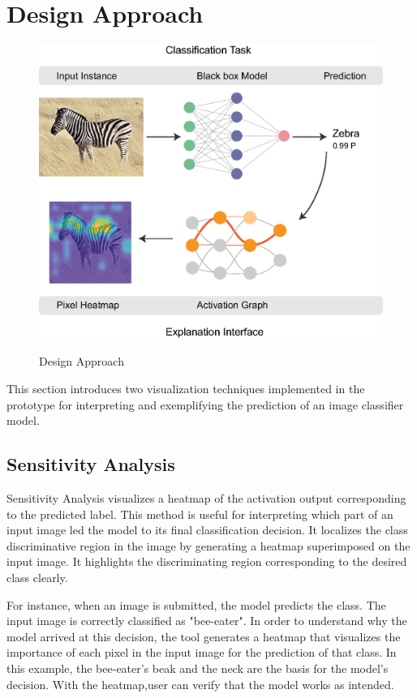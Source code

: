 \section{Design Approach}

\begin{figure}[htbp]
\centering\textbf{}
\includegraphics[width=1\textwidth]{images/method-schema-copy.eps}
\caption{Design Approach}
\label{fig:design-approach}
\end{figure}

This section introduces two visualization techniques implemented in the prototype for interpreting and exemplifying the prediction of an image classifier model.

\subsection{Sensitivity Analysis}

Sensitivity Analysis visualizes a heatmap of the activation output corresponding to the predicted label. This method is useful for interpreting which part of an input image led the model to its final classification decision. It localizes the class discriminative region in the image by generating a heatmap superimposed on the input image. It highlights the discriminating region corresponding to the desired class clearly.

For instance, when an image is submitted, the model predicts the class. The input image is correctly classified as "bee-eater". In order to understand why the model arrived at this decision, the tool generates a heatmap that visualizes the importance of each pixel in the input image for the prediction of that class. In this example, the bee-eater's beak and the neck are the basis for the model's decision. With the heatmap,user can verify that the model works as intended.

